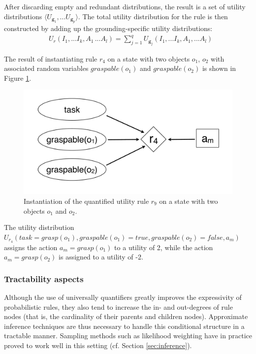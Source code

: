 After discarding empty and redundant distributions, the result is a set of utility distributions $ \langle U_{\mathbf{g}_1},... U_{\mathbf{g}_p} \rangle$. The total utility distribution for the rule is then constructed by adding up the grounding-specific utility distributions:   
\begin{align}
& U_{r}(I_1,... I_k, A_1\,... A_l) = \sum_{j=1}^{q} U_{\mathbf{g}_j}(I_1,... I_k, A_1,... A_l) \label{eq:quantifruledistrib}
\end{align}


The result of instantiating rule $r_4$ on a state with two objects $o_1$, $o_2$ with associated random variables $\mathit{graspable}(o_1)$ and $\mathit{graspable}(o_2)$ is shown in Figure  \ref{fig:quantinstantitionutil}.  

\begin{figure}[h]
\centering
\includegraphics[scale=0.25]{imgs/quantutilruleinstantiation.pdf}
\caption{Instantiation of the quantified utility rule $r_9$ on a state with two objects $o_1$ and $o_2$.}
\label{fig:quantinstantitionutil}
\end{figure}

The utility distribution $U_{r_4}(\mathit{task}\!=\!\mathit{grasp}(o_1), \mathit{graspable}(o_1) \!=\!\mathit{true}, \mathit{graspable}(o_2)\!=\!\mathit{false}, a_m)$ assigns the action $a_m\!=\!\mathit{grasp}(o_1)$ to a utility of 2, while the action $a_m\!=\!\mathit{grasp(o_2)}$ is assigned to a utility of -2. 

\subsubsection*{Tractability aspects}

Although the use of universally quantifiers greatly improves the expressivity of probabilistic rules, they also tend to increase the in- and out-degrees of rule nodes (that is, the cardinality of their parents and children nodes). Approximate inference techniques are thus necessary to handle this conditional structure in a tractable manner. Sampling methods such as likelihood weighting have in practice proved to work well in this setting (cf. Section \ref{sec:inference}).

